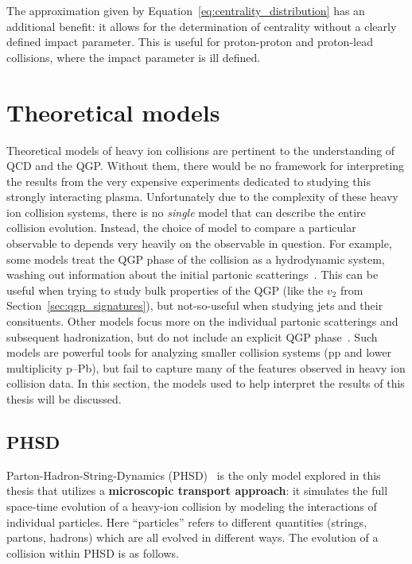 The approximation given by Equation~\ref{eq:centrality_distribution} has an additional benefit: it allows for the determination of centrality without a clearly defined impact parameter. This is useful for proton-proton and proton-lead collisions, where the impact parameter is ill defined. 


\section{Theoretical models}
\label{sec:models}

Theoretical models of heavy ion collisions are pertinent to the understanding of QCD and the QGP. Without them, there would be no framework for interpreting the results from the very expensive experiments dedicated to studying this strongly interacting plasma. Unfortunately due to the complexity of these heavy ion collision systems, there is no \textit{single} model that can describe the entire collision evolution. Instead, the choice of model to compare a particular observable to depends very heavily on the observable in question. For example, some models treat the QGP phase of the collision as a hydrodynamic system, washing out information about the initial partonic scatterings~\cite{EPOS}. This can be useful when trying to study bulk properties of the QGP (like the $v_2$ from Section~\ref{sec:qgp_signatures}), but not-so-useful when studying jets and their consituents. Other models focus more on the individual partonic scatterings and subsequent hadronization, but do not include an explicit QGP phase~\cite{Pythia, DPMJet}. Such models are powerful tools for analyzing smaller collision systems (pp and lower multiplicity p--Pb), but fail to capture many of the features observed in heavy ion collision data. In this section, the models used to help interpret the results of this thesis will be discussed.

\subsection{PHSD}
Parton-Hadron-String-Dynamics (PHSD)~\cite{PHSD1, PHSD2} is the only model explored in this thesis that utilizes a \textbf{microscopic transport approach}: it simulates the full space-time evolution of a heavy-ion collision by modeling the interactions of individual particles. Here ``particles'' refers to different quantities (strings, partons, hadrons) which are all evolved in different ways. The evolution of a collision within PHSD is as follows.

